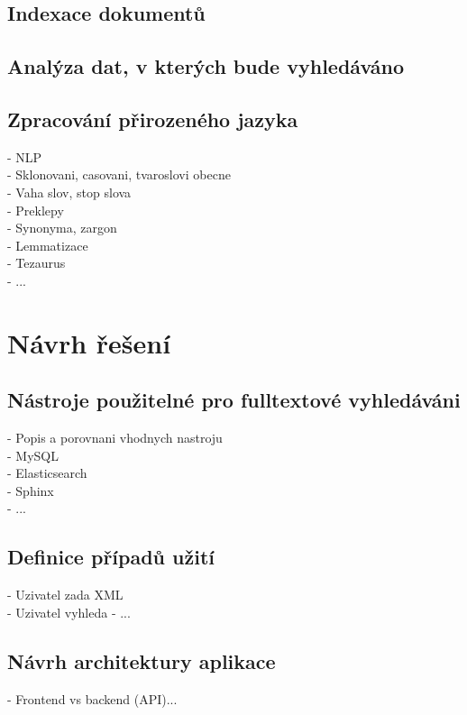 \documentclass[FM,DP]{tulthesis}
\begin{document}
\section{Indexace dokumentů}

\section{Analýza dat, v kterých bude vyhledáváno}

\section{Zpracování přirozeného jazyka}
- NLP\\
- Sklonovani, casovani, tvaroslovi obecne\\
- Vaha slov, stop slova\\
- Preklepy\\
- Synonyma, zargon\\
- Lemmatizace\\
- Tezaurus\\
- ...

\chapter{Návrh řešení}

\section{Nástroje použitelné pro fulltextové vyhledáváni}
- Popis a porovnani vhodnych nastroju\\
\hspace*{5mm}- MySQL\\
\hspace*{5mm}- Elasticsearch\\
\hspace*{5mm}- Sphinx\\
\hspace*{5mm}- ...

\section{Definice případů užití}
- Uzivatel zada XML\\
- Uzivatel vyhleda
- ...

\section{Návrh architektury aplikace}
- Frontend vs backend (API)...
\end{document}
